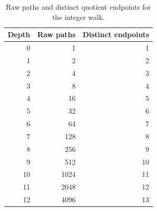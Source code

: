 \begin{table}[htbp]
\centering
\caption{Raw paths and distinct quotient endpoints for the integer walk.}
\label{tab:walk-growth}
\begin{tabular}{rrr}
\toprule
Depth & Raw paths & Distinct endpoints \\
\midrule
0 & 1 & 1 \\
1 & 2 & 2 \\
2 & 4 & 3 \\
3 & 8 & 4 \\
4 & 16 & 5 \\
5 & 32 & 6 \\
6 & 64 & 7 \\
7 & 128 & 8 \\
8 & 256 & 9 \\
9 & 512 & 10 \\
10 & 1024 & 11 \\
11 & 2048 & 12 \\
12 & 4096 & 13 \\
\bottomrule
\end{tabular}
\end{table}
